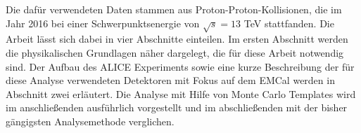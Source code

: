 Die dafür verwendeten Daten stammen aus Proton-Proton-Kollisionen, die im Jahr 2016 bei einer Schwer\-punkts\-en\-er\-gie von $\sqrt{s}=13$ TeV stattfanden.
\newline
Die Arbeit lässt sich dabei in vier Abschnitte einteilen.
Im ersten Abschnitt werden die physikalischen Grundlagen näher dargelegt, die für diese Arbeit notwendig sind.
Der Aufbau des ALICE Experiments sowie eine kurze Beschreibung der für diese Analyse verwendeten Detektoren mit Fokus auf dem EMCal werden in Abschnitt zwei erläutert.
Die Analyse mit Hilfe von Monte Carlo Templates wird im anschließenden ausführlich vorgestellt und im  abschließenden mit der bisher gängigsten Analysemethode verglichen.
